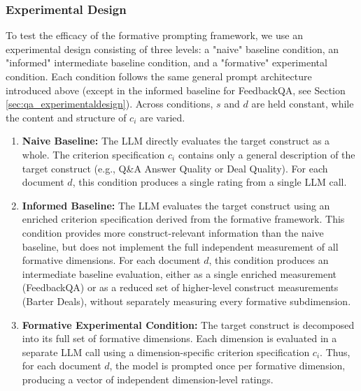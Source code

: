 

\subsubsection{Experimental Design}

To test the efficacy of the formative prompting framework, we use an experimental design consisting of three levels: a "naive" baseline condition, an "informed" intermediate baseline condition, and a "formative" experimental condition. Each condition follows the same general prompt architecture introduced above (except in the informed baseline for FeedbackQA, see Section \ref{sec:qa_experimentaldesign}). Across conditions, $s$ and $d$ are held constant, while the content and structure of $c_i$ are varied.

\begin{enumerate}
    \item \textbf{Naive Baseline:} The LLM directly evaluates the target construct as a whole. The criterion specification $c_i$ contains only a general description of the target construct (e.g., Q\&A Answer Quality or Deal Quality). For each document $d$, this condition produces a single rating from a single LLM call.

    \item \textbf{Informed Baseline:} The LLM evaluates the target construct using an enriched criterion specification derived from the formative framework. This condition provides more construct-relevant information than the naive baseline, but does not implement the full independent measurement of all formative dimensions. For each document $d$, this condition produces an intermediate baseline evaluation, either as a single enriched measurement (FeedbackQA) or as a reduced set of higher-level construct measurements (Barter Deals), without separately measuring every formative subdimension.

    \item \textbf{Formative Experimental Condition:} The target construct is decomposed into its full set of formative dimensions. Each dimension is evaluated in a separate LLM call using a dimension-specific criterion specification $c_i$. Thus, for each document $d$, the model is prompted once per formative dimension, producing a vector of independent dimension-level ratings.
\end{enumerate}

